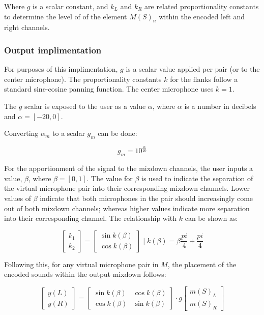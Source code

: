 Where $g$ is a scalar constant, and $k_L$ and $k_R$ are related proportionality constants to determine the level of of the element $M(S)_n$ within the encoded left and right channels. 

\subsubsection{Output implimentation}

For purposes of this implimentation, $g$ is a scalar value applied per pair (or to the center microphone). The proportionality constants $k$ for the flanks follow a standard sine-cosine panning function. The center microphone uses $k = 1$.

The $g$ scalar is exposed to the user as a value $\alpha$, where $\alpha$ is a number in decibels and $\alpha = [-20,0]$.

Converting $\alpha_m$ to a scalar $g_m$ can be done:

\begin{equation}
	g_m = 10^{\frac{\alpha}{20}}
\end{equation}

For the apportionment of the signal to the mixdown channels, the user inputs a value, $\beta$, where $\beta = [0, 1]$. The value for $\beta$ is used to indicate the separation of the virtual microphone pair into their corresponding mixdown channels. Lower values of $\beta$ indicate that both microphones in the pair should increasingly come out of both mixdown channels; whereas higher values indicate more separation into their corresponding channel. The relationship with $k$ can be shown as:

\begin{equation}\label{pairsPanning}
	\begin{bmatrix} k_1 \\ k_2 \end{bmatrix} =  \begin{bmatrix} \sin{k(\beta)} \\ \cos{k(\beta)} \end{bmatrix} \; | \; k(\beta) = \beta\frac{pi}{4} + \frac{pi}{4}
\end{equation}

Following this, for any virtual microphone pair in $M$, the placement of the encoded sounds within the output mixdown follows:

\begin{equation}\label{centerPanning}
	\begin{bmatrix} y(L) \\ y(R) \end{bmatrix} =  \begin{bmatrix} \sin{k(\beta)} & \cos{k(\beta)} \\ \cos{k(\beta)} & \sin{k(\beta)}  \end{bmatrix} \cdot g\begin{bmatrix} m(S)_L \\ m(S)_R \end{bmatrix}
\end{equation}


